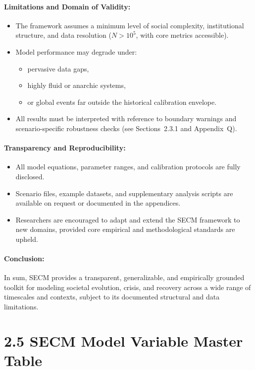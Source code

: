 \documentclass[12pt]{report}
\begin{document}
\paragraph{Limitations and Domain of Validity:}
\begin{itemize}
  \item The framework assumes a minimum level of social complexity, institutional structure, and data resolution ($N > 10^5$, with core metrics accessible).
  \item Model performance may degrade under:
  \begin{itemize}
    \item pervasive data gaps,
    \item highly fluid or anarchic systems,
    \item or global events far outside the historical calibration envelope.
  \end{itemize}
  \item All results must be interpreted with reference to boundary warnings and scenario-specific robustness checks (see Sections~2.3.1 and Appendix~Q).
\end{itemize}

\paragraph{Transparency and Reproducibility:}
\begin{itemize}
  \item All model equations, parameter ranges, and calibration protocols are fully disclosed.
  \item Scenario files, example datasets, and supplementary analysis scripts are available on request or documented in the appendices.
  \item Researchers are encouraged to adapt and extend the SECM framework to new domains, provided core empirical and methodological standards are upheld.
\end{itemize}

\paragraph{Conclusion:}
In sum, SECM provides a transparent, generalizable, and empirically grounded toolkit for modeling societal evolution, crisis, and recovery across a wide range of timescales and contexts, subject to its documented structural and data limitations.


\section{2.5 SECM Model Variable Master Table}
\end{document}
